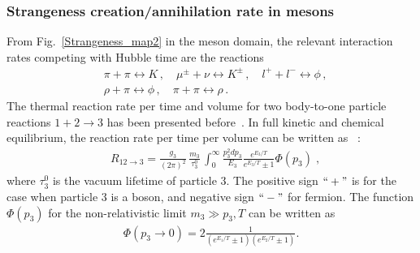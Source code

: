 \subsubsection{Strangeness creation/annihilation rate in mesons}
From Fig.~\ref{Strangeness_map2} in the meson domain, the relevant interaction rates competing with Hubble time are the reactions
\begin{align}
 &\pi+\pi\leftrightarrow K\,,\quad\mu^\pm+\nu\leftrightarrow K^\pm\,,\quad l^++l^-\leftrightarrow\phi\,,\\
 &\rho+\pi\leftrightarrow\phi\,,\quad \pi+\pi\leftrightarrow\rho\,.
\end{align}
The thermal reaction rate per time and volume for two body-to-one particle reactions $1+2\rightarrow 3$ has been presented before~\cite{Koch:1986ud,Kuznetsova:2008jt,Kuznetsova:2010pi}. In full kinetic and chemical equilibrium, the reaction rate per time per volume can be written as~\cite{Kuznetsova:2010pi} :
\begin{align}
&R_{12\to 3}=\frac{g_3}{(2\pi)^2}\,\frac{m_3}{\tau^0_3}\,\int^\infty_0\frac{p^2_3dp_3}{E_3}\frac{e^{E_3/T}}{e^{E_3/T}\pm1}\Phi(p_3)\;,
\end{align}
where $\tau^0_3$ is the vacuum lifetime of particle $3$. The positive sign $``+"$ is for the case when particle $3$ is a boson, and negative sign $``-"$ for fermion. The function $\Phi(p_3)$ for the non-relativistic limit $m_3\gg p_3,T$ can be written as 
\begin{align}
\Phi(p_3\to0)=2\frac{1}{(e^{E_1/T}\pm1)(e^{E_2/T}\pm1)}.
\end{align}


